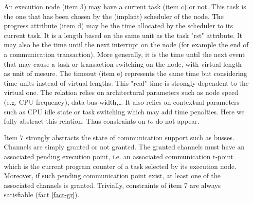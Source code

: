 \documentclass{article}
\begin{document}
An execution node (item 3) may have a current task (item c) or not. This task is the one that has been chosen by the (implicit) scheduler of the node. The progress attribute (item d) may be the time allocated by the scheduler to its current task. It is a length based on the same unit as the task "rst" attribute. It may also be the time until the next interrupt on the node (for example the end of a communication transaction). More generally, it is the time until the next event that may cause a task or transaction switching on the node, with virtual length as unit of mesure. The timeout (item e) represents the same time but considering time units instead of virtual lengths. This "real" time is strongly dependent to the virtual one. The relation relies on architectural parameters such as node speed (e.g. CPU frequency), data bus width,\ldots\/ It also relies on contextual parameters such as CPU idle state or task switching which may add time penalties. Here we fully abstract this relation. Thus constraints on $to$ do not appear. 

Item 7 strongly abstracts the state of communication support such as busses. Channels are simply granted or not granted. The granted channels must have an associated pending execution point, i.e. an associated communication t-point which is the current program counter of a task selected by its execution node. Moreover, if such pending communication point exist, at least one of the associated channels is granted. Trivially, constraints of item 7 are always satisfiable (fact \ref{fact-gr}).
\end{document}
